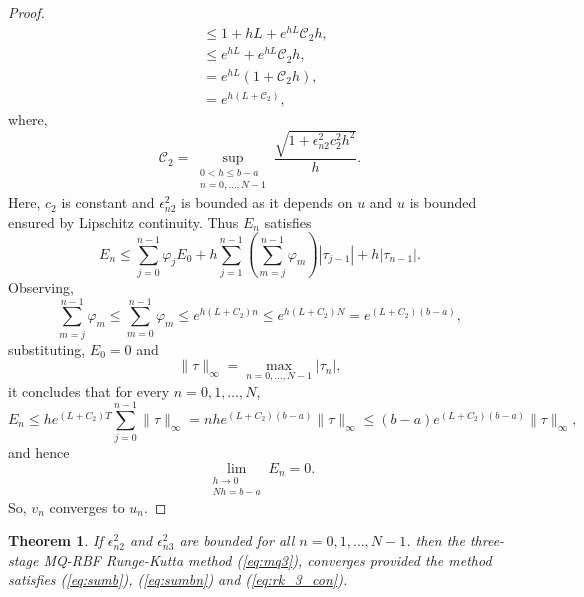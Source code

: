\documentclass[a4paper, preprint,11pt]{elsarticle}
\newtheorem{theorem}{Theorem}[section]
\numberwithin{equation}{section}
\begin{document}
\begin{proof}
\begin{align*}
   & \leq 1 + h L + e^{hL}\mathcal{C}_2h, \\
   & \leq e^{hL} +  e^{hL}\mathcal{C}_2h,\\
   & =  e^{hL}(1 + \mathcal{C}_2h ),   \\
   & = e^{h(L+\mathcal{C}_2)},
\end{align*} where,
\[
\mathcal{C}_2 = \sup_{\substack{0 < h \leq b - a \\ n = 0, \dots, N - 1}} 
\frac{ \sqrt{1 + \epsilon_{n2}^2 c_2^2 h^2}}{h}.
\]
Here, $c_2$ is constant and $\epsilon_{n2}^2$ is bounded as it depends on $u$ and $u$ is bounded ensured by Lipschitz continuity. %
Thus $E_n$ satisfies  
\begin{equation*}
    E_n \leq \sum_{j=0}^{n-1} \varphi_j E_0 + h \sum_{j=1}^{n-1} \left( \sum_{m=j}^{n-1} \varphi_m \right) |\tau_{j-1}| + h |\tau_{n-1}|.
\end{equation*}
Observing,
\begin{equation*}
    \sum_{m=j}^{n-1} \varphi_m \leq \sum_{m=0}^{n-1} \varphi_m \leq e^{h(L + C_2) n} \leq e^{h(L + C_2) N} = e^{(L + C_2)(b - a)},
\end{equation*}
substituting, \( E_0 = 0 \) and
\[
\|\tau\|_\infty = \max_{n = 0, \dots, N-1} |\tau_n|,
\]
it concludes that for every \( n = 0, 1, \dots, N \),
\begin{equation*}
    E_n \leq h e^{(L + C_2) T} \sum_{j=0}^{n-1} \|\tau\|_\infty = n h e^{(L + C_2)(b - a)} \|\tau\|_\infty \leq (b - a) e^{(L + C_2)(b - a)} \|\tau\|_\infty,
\end{equation*}
and hence 
\begin{equation*}
\lim_{\substack{h \to 0 \\ N h = b - a}} E_n = 0.
\end{equation*}
So, $v_n$ converges to $u_n$.
\end{proof} 
\begin{theorem} If $\epsilon_{n2}^2$ and $\epsilon_{n3}^2$
are bounded for all $n = 0, 1, \dots, N - 1$. then the
three-stage MQ-RBF Runge-Kutta method (\ref{eq:mq3}), converges provided the method satisfies (\ref{eq:sumb}), (\ref{eq:sumbn}) and
(\ref{eq:rk_3_con}).
\end{theorem}
\end{document}
